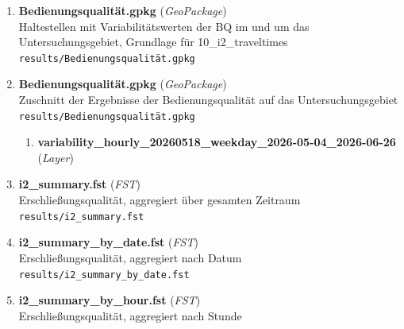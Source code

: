 \begin{enumerate}[label=\arabic*., leftmargin=*, itemsep=0.5em, topsep=0.3em]
\begin{enumerate}[label=\arabic{enumi}.\arabic*, leftmargin=*, itemsep=0.5em, topsep=0.3em]
\begin{enumerate}[label=\arabic{enumi}.\arabic{enumii}.\arabic*, leftmargin=*, itemsep=0.5em, topsep=0.3em]
\texttt{\small results/reports/EQ\_Atlas.pdf}
\item \textbf{Erschließungsqualität.pdf} \textnormal{(\textit{PDF})}\\
Größerformatige Darstellung nur der Erschhlließungsqualität. 1 Seite je Gemeinde.\\
\texttt{\small results/reports/Erschließungsqualität.pdf}
\item \textbf{Indikator\_03\_Atlas.pdf} \textnormal{(\textit{PDF})}\\
Darstelllung der Erreichbarkeit zentraler Orte je Gemeinde mit Variabilitätsmaßen. 4 Seiten je Gemeinde.\\
\texttt{\small results/reports/Indikator\_03\_Atlas.pdf}
\end{enumerate}
\item \textbf{Bedienungsqualität.gpkg} \textnormal{(\textit{GeoPackage})}\\
Haltestellen mit Variabilitätswerten der BQ im und um das Untersuchungsgebiet, Grundlage für 10\_i2\_traveltimes\\
\texttt{\small results/Bedienungsqualität.gpkg}
\item \textbf{Bedienungsqualität.gpkg} \textnormal{(\textit{GeoPackage})}\\
Zuschnitt der Ergebnisse der Bedienungsqualität auf das Untersuchungsgebiet\\
\texttt{\small results/Bedienungsqualität.gpkg}
\begin{enumerate}[label=\arabic{enumi}.\arabic{enumii}.\arabic*, leftmargin=*, itemsep=0.5em, topsep=0.3em]
\item \textbf{variability\_hourly\_20260518\_weekday\_2026-05-04\_2026-06-26} \textnormal{(\textit{Layer})}
\end{enumerate}
\item \textbf{i2\_summary.fst} \textnormal{(\textit{FST})}\\
Erschließungsqualität, aggregiert über gesamten Zeitraum\\
\texttt{\small results/i2\_summary.fst}
\item \textbf{i2\_summary\_by\_date.fst} \textnormal{(\textit{FST})}\\
Erschließungsqualität, aggregiert nach Datum\\
\texttt{\small results/i2\_summary\_by\_date.fst}
\item \textbf{i2\_summary\_by\_hour.fst} \textnormal{(\textit{FST})}\\
Erschließungsqualität, aggregiert nach Stunde\\

\end{enumerate}
\end{enumerate}
